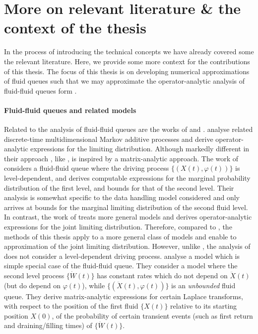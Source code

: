 \section{More on relevant literature \& the context of the thesis} 
In the process of introducing the technical concepts we have already covered some the relevant literature. Here, we provide some more context for the contributions of this thesis. The focus of this thesis is on developing numerical approximations of fluid queues such that we may approximate the operator-analytic analysis of fluid-fluid queues form \cite{bo2014}. %

\paragraph{Fluid-fluid queues and related models} Related to the analysis of fluid-fluid queues are the works of \cite{mz2012,lnp13,bo2013b} and \cite{boz2022}. \cite{mz2012} analyse related discrete-time multidimensional Markov additive processes and derive operator-analytic expressions for the limiting distribution. Although markedly different in their approach \cite{mz2012}, like  \cite{bo2014}, is inspired by a matrix-analytic approach. The work of \cite{lnp13} considers a fluid-fluid queue where the driving process \(\{(X(t),\varphi(t))\}\) is level-dependent, and derives computable expressions for the marginal probability distribution of the first level, and bounds for that of the second level. Their analysis is somewhat specific to the data handling model considered and only arrives at bounds for the marginal limiting distribution of the second fluid level. In contrast, the work of \cite{bo2014} treats more general models and derives operator-analytic expressions for the joint limiting distribution. Therefore, compared to \cite{lnp13}, the methods of this thesis apply to a more general class of models and enable to approximation of the joint limiting distribution. However, unlike \cite{lnp13}, the analysis of \cite{bo2014} does not consider a level-dependent driving process. %
\cite{bo2013b} analyse a model which is simple special case of the fluid-fluid queue. They consider a model where the second level process \(\{\dot W(t)\}\) has constant rates which do not depend on \(\ddot X(t)\) (but do depend on \(\varphi(t)\)), while \(\{(\ddot X(t),\varphi(t))\}\) is an \emph{unbounded} fluid queue. They derive matrix-analytic expressions for certain Laplace transforms, with respect to the position of the first fluid \(\{X(t)\}\) relative to its starting position \(X(0)\), of the probability of certain transient events (such as first return and draining/filling times) of \(\{\dot W(t)\}\). %
